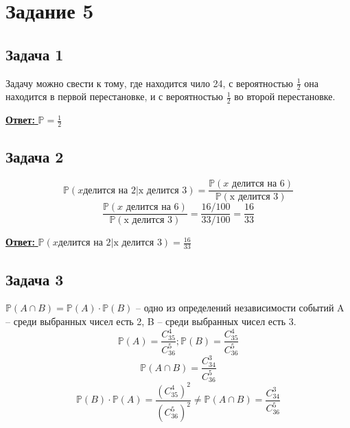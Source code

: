 \documentclass[a4paper,14pt]{article} %
\begin{document}

\section{Задание 5}

\subsection{Задача 1}
Задачу можно свести к тому, где находится чило 24, с вероятностью $\frac{1}{2}$ она находится в первой
перестановке, и с вероятностью $\frac{1}{2}$ во второй перестановке.

\underline{\textbf{Ответ: }} $\mathds{P} = \frac{1}{2}$

\subsection{Задача 2}
\begin{equation*}
	\mathds{P}(x \text{делится на 2}| \text{x делится 3}) = \frac{\mathds{P}(x \text{ делится на 6})}{\mathds{P}(\text{x делится 3})}	
\end{equation*}
\begin{equation*}
	\frac{\mathds{P}(x \text{ делится на 6})}{\mathds{P}(\text{x делится 3})} = \frac{16/100}{33/100} = \frac{16}{33}
\end{equation*}

\underline{\textbf{Ответ: }} $\mathds{P}(x \text{делится на 2}| \text{x делится 3}) = \frac{16}{33}$

\subsection{Задача 3}
$\mathds{P}(A \cap B) = \mathds{P}(A) \cdot \mathds{P}(B)$ -- одно из определений независимости событий
\newline
A -- среди выбранных чисел есть 2, B -- среди выбранных чисел есть 3.
\newline
\begin{equation*}
	\mathds{P}(A) = \frac{C_{35}^4}{C_{36}^5}; \mathds{P}(B) = \frac{C_{35}^4}{C_{36}^5}	
\end{equation*}
\begin{equation*}
	\mathds{P}(A \cap B) = \frac{C_{34}^3}{C_{36}^5}	
\end{equation*}
\begin{equation*}
	\mathds{P}(B) \cdot \mathds{P}(A) = \frac{(C_{35}^4)^2}{(C_{36}^5)^2} \not = \mathds{P}(A \cap B) = \frac{C_{34}^3}{C_{36}^5}	
\end{equation*}
\end{document}
